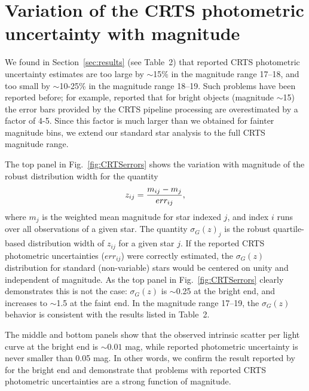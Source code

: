 \documentclass[fleqn,usenatbib]{mnras}
\begin{document}

 


\appendix
\section{Variation of the CRTS photometric uncertainty with magnitude} 
\label{sec:crts_photometry}

We found in Section~\ref{sec:results} (see Table~2) that reported CRTS photometric uncertainty estimates 
are too large by $\sim$15\% in the magnitude range 17--18, and too small by $\sim$10-25\% in the 
magnitude range 18--19. Such problems have been reported before; for example, \cite{vaughan2016}
reported that for bright objects (magnitude $\sim$15) the error bars provided by the CRTS pipeline 
processing are overestimated by a factor of 4-5. Since this factor is much larger than we obtained
for fainter magnitude bins, we extend our standard star analysis to the full CRTS magnitude range. 

The top panel in Fig.~\ref{fig:CRTSerrors} shows the variation with magnitude of the robust distribution 
width for the quantity 
\begin{equation} 
\label{eq:z} 
           z_{ij} = { m_{ij} - m_j \over err_{ij} },
\end{equation}
where  $m_{j}$ is the weighted mean magnitude for star indexed $j$, and index $i$ runs over all
observations of a given star. The quantity $\sigma_G(z)_j$ is the robust quartile-based distribution 
width of $z_{ij}$ for a given star $j$. If the reported CRTS photometric uncertainties ($err_{ij}$) were 
correctly estimated, the $\sigma_G(z)$ distribution for standard (non-variable) stars would be 
centered on unity and independent of magnitude. As the  top panel in Fig.~\ref{fig:CRTSerrors} 
clearly demonstrates this is not the case: $\sigma_G(z)$ is $\sim$0.25 at the bright end, and 
increases to $\sim$1.5 at the faint end. In the magnitude range 17--19, the $\sigma_G(z)$ 
behavior is consistent with the results listed in Table~2. 

The middle and bottom panels show that the observed intrinsic scatter per light curve at the bright
end is $\sim0.01$ mag, while reported photometric uncertainty is never smaller than 0.05 mag. 
In other words, we confirm the result reported by \cite{vaughan2016} for the bright end and
demonstrate that problems with reported CRTS photometric uncertainties are a strong function
of magnitude. 
\end{document}
